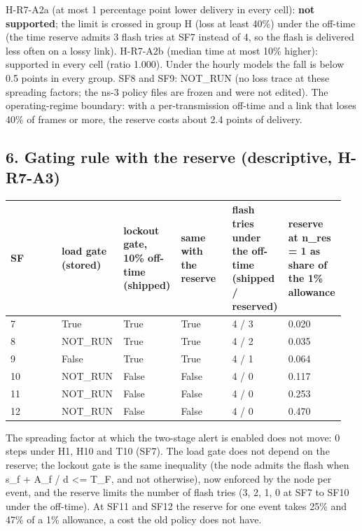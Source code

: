 H-R7-A2a (at most 1 percentage point lower delivery in every cell): \textbf{not supported}; the limit is crossed in group H (loss at least 40\%) under the off-time (the time reserve admits 3 flash tries at SF7 instead of 4, so the flash is delivered less often on a lossy link). H-R7-A2b (median time at most 10\% higher): supported in every cell (ratio 1.000). Under the hourly models the fall is below 0.5 points in every group. SF8 and SF9: NOT\_RUN (no loss trace at these spreading factors; the ns-3 policy files are frozen and were not edited). The operating-regime boundary: with a per-transmission off-time and a link that loses 40\% of frames or more, the reserve costs about 2.4 points of delivery.

\subsection*{6. Gating rule with the reserve (descriptive, H-R7-A3)}

{\scriptsize\raggedright
\begin{longtable}{p{0.158\linewidth}p{0.158\linewidth}p{0.158\linewidth}p{0.158\linewidth}p{0.158\linewidth}p{0.158\linewidth}}
\toprule
SF & load gate (stored) & lockout gate, 10\% off-time (shipped) & same with the reserve & flash tries under the off-time (shipped / reserved) & reserve at n\_res = 1 as share of the 1\% allowance \\
\midrule
\endhead
7 & True & True & True & 4 / 3 & 0.020 \\
8 & NOT\_RUN & True & True & 4 / 2 & 0.035 \\
9 & False & True & True & 4 / 1 & 0.064 \\
10 & NOT\_RUN & False & False & 4 / 0 & 0.117 \\
11 & NOT\_RUN & False & False & 4 / 0 & 0.253 \\
12 & NOT\_RUN & False & False & 4 / 0 & 0.470 \\
\bottomrule
\end{longtable}}

The spreading factor at which the two-stage alert is enabled does not move: 0 steps under H1, H10 and T10 (SF7). The load gate does not depend on the reserve; the lockout gate is the same inequality (the node admits the flash when s\_f + A\_f / d <= T\_F, and not otherwise), now enforced by the node per event, and the reserve limits the number of flash tries (3, 2, 1, 0 at SF7 to SF10 under the off-time). At SF11 and SF12 the reserve for one event takes 25\% and 47\% of a 1\% allowance, a cost the old policy does not have.

